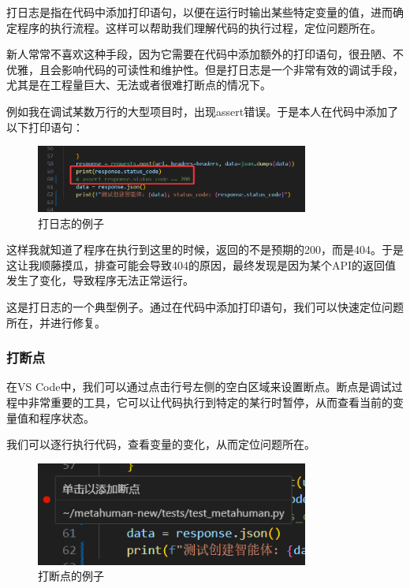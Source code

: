 \documentclass[../main.tex]{subfiles}
\begin{document}
打日志是指在代码中添加打印语句，以便在运行时输出某些特定变量的值，进而确定程序的执行流程。这样可以帮助我们理解代码的执行过程，定位问题所在。

新人常常不喜欢这种手段，因为它需要在代码中添加额外的打印语句，很丑陋、不优雅，且会影响代码的可读性和维护性。但是打日志是一个非常有效的调试手段，尤其是在工程量巨大、无法或者很难打断点的情况下。

例如我在调试某数万行的大型项目时，出现assert错误。于是本人在代码中添加了以下打印语句：

\begin{figure}[htbp]
\centering
\includegraphics[width=0.8\textwidth]{images/printlog.png}
\caption{打日志的例子}
\end{figure}

这样我就知道了程序在执行到这里的时候，返回的不是预期的200，而是404。于是这让我顺藤摸瓜，排查可能会导致404的原因，最终发现是因为某个API的返回值发生了变化，导致程序无法正常运行。

这是打日志的一个典型例子。通过在代码中添加打印语句，我们可以快速定位问题所在，并进行修复。

\subsubsection{打断点}

在VS Code中，我们可以通过点击行号左侧的空白区域来设置断点。断点是调试过程中非常重要的工具，它可以让代码执行到特定的某行时暂停，从而查看当前的变量值和程序状态。

我们可以逐行执行代码，查看变量的变化，从而定位问题所在。

\begin{figure}[htbp]
\centering
\includegraphics[width=0.8\textwidth]{images/breakpoints.png}
\caption{打断点的例子}
\end{figure}
\end{document}
